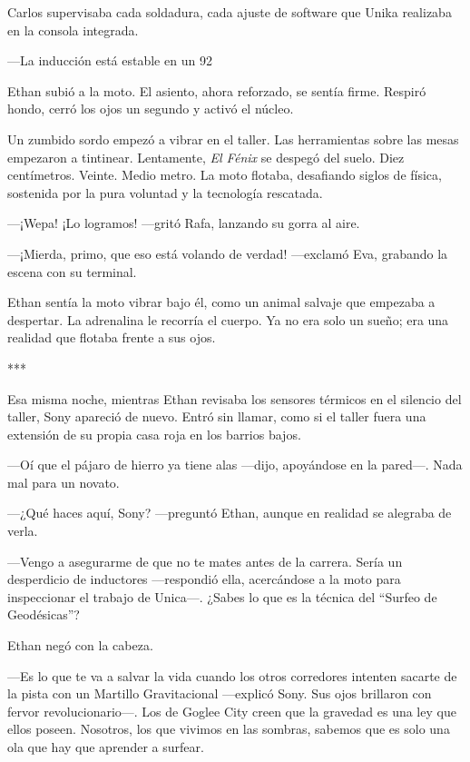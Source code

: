 \documentclass[11pt,twoside]{book}
\begin{document}
Carlos supervisaba cada soldadura, cada ajuste de software que Unika realizaba en la consola integrada.

---La inducción está estable en un 92%

Ethan subió a la moto. El asiento, ahora reforzado, se sentía firme. Respiró hondo, cerró los ojos un segundo y activó el núcleo.

Un zumbido sordo empezó a vibrar en el taller. Las herramientas sobre las mesas empezaron a tintinear. Lentamente, \textit{El Fénix} se despegó del suelo. Diez centímetros. Veinte. Medio metro. La moto flotaba, desafiando siglos de física, sostenida por la pura voluntad y la tecnología rescatada.

---¡Wepa! ¡Lo logramos! ---gritó Rafa, lanzando su gorra al aire.

---¡Mierda, primo, que eso está volando de verdad! ---exclamó Eva, grabando la escena con su terminal.

Ethan sentía la moto vibrar bajo él, como un animal salvaje que empezaba a despertar. La adrenalina le recorría el cuerpo. Ya no era solo un sueño; era una realidad que flotaba frente a sus ojos.

\bigskip
\begin{center}***\end{center}
\bigskip

Esa misma noche, mientras Ethan revisaba los sensores térmicos en el silencio del taller, Sony apareció de nuevo. Entró sin llamar, como si el taller fuera una extensión de su propia casa roja en los barrios bajos.

---Oí que el pájaro de hierro ya tiene alas ---dijo, apoyándose en la pared---. Nada mal para un novato.

---¿Qué haces aquí, Sony? ---preguntó Ethan, aunque en realidad se alegraba de verla.

---Vengo a asegurarme de que no te mates antes de la carrera. Sería un desperdicio de inductores ---respondió ella, acercándose a la moto para inspeccionar el trabajo de Unica---. ¿Sabes lo que es la técnica del ``Surfeo de Geodésicas''?

Ethan negó con la cabeza.

---Es lo que te va a salvar la vida cuando los otros corredores intenten sacarte de la pista con un Martillo Gravitacional ---explicó Sony. Sus ojos brillaron con fervor revolucionario---. Los de Goglee City creen que la gravedad es una ley que ellos poseen. Nosotros, los que vivimos en las sombras, sabemos que es solo una ola que hay que aprender a surfear.
\end{document}
